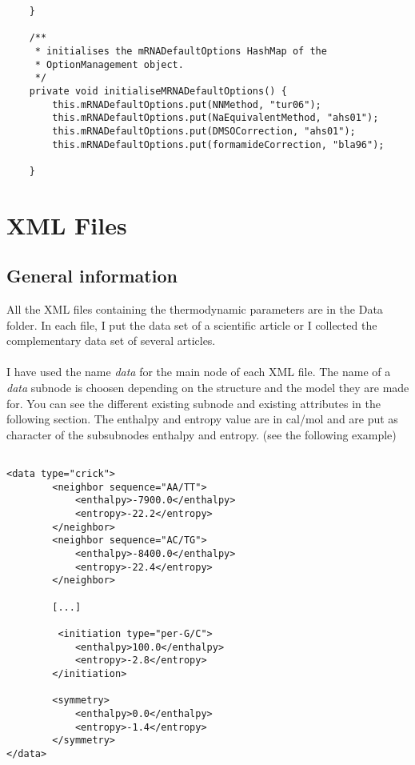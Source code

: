 \documentclass{article}
\begin{document}
\begin{verbatim}
	}
	
	/**
	 * initialises the mRNADefaultOptions HashMap of the 
	 * OptionManagement object.
	 */
	private void initialiseMRNADefaultOptions() {
		this.mRNADefaultOptions.put(NNMethod, "tur06");
		this.mRNADefaultOptions.put(NaEquivalentMethod, "ahs01");
		this.mRNADefaultOptions.put(DMSOCorrection, "ahs01");
		this.mRNADefaultOptions.put(formamideCorrection, "bla96");

	}

\end{verbatim}

\section{XML Files}

\subsection{General information}

All the XML files containing the thermodynamic parameters are in the Data folder. In each 
file, I put the data set of a scientific article or I collected the complementary data set 
of several articles. \\
\\
I have used the name \textit{data} for the main node of each XML file. The name of a \textit{data}
subnode is choosen depending on the structure and the model they are made for. You can see the different
existing subnode and existing attributes in the following section.
The enthalpy and entropy value are in cal/mol and are put as character of the subsubnodes enthalpy
and entropy. (see the following example)

\begin{verbatim}

<data type="crick">
		<neighbor sequence="AA/TT">
	        <enthalpy>-7900.0</enthalpy>
            <entropy>-22.2</entropy>
	    </neighbor> 
	   	<neighbor sequence="AC/TG">
	        <enthalpy>-8400.0</enthalpy>
            <entropy>-22.4</entropy>
	   	</neighbor> 
	   	
	   	[...]
	   	
	   	 <initiation type="per-G/C">
            <enthalpy>100.0</enthalpy>
            <entropy>-2.8</entropy>
        </initiation>  
        
        <symmetry>
            <enthalpy>0.0</enthalpy>
            <entropy>-1.4</entropy>
        </symmetry>
</data>

\end{verbatim}
\end{document}
